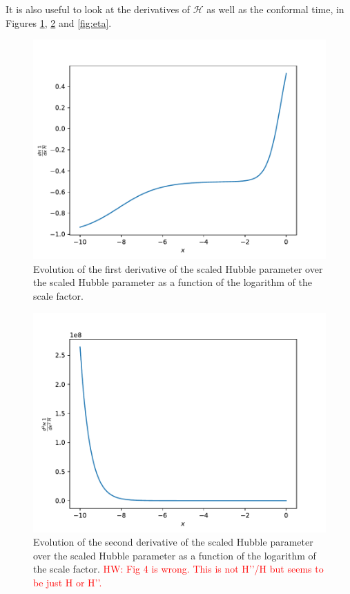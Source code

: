 \documentclass{aa}
\newcommand{\hw}[1]{\textcolor{red}{HW: #1}}
\begin{document}
It is also useful to look at the derivatives of $\mathcal H$ as well as the conformal time, in Figures \ref{fig:dhpdx}, \ref{fig:ddhpddx} and \ref{fig:eta}.
\begin{figure}[ht]
\centering
\includegraphics[width=\hsize]{figures/dHpdx_over_Hp.pdf}
  \caption{Evolution of the first derivative of the scaled Hubble parameter over the scaled Hubble parameter as a function of the logarithm of the scale factor.}
     \label{fig:dhpdx}
\end{figure}

\begin{figure}[ht]
\centering
\includegraphics[width=\hsize]{figures/ddHpddx_over_Hp.pdf}
  \caption{Evolution of the second derivative of the scaled Hubble parameter over the scaled Hubble parameter as a function of the logarithm of the scale factor. \hw{Fig 4 is wrong. This is not H’’/H but seems to be just H or H’’.}}
     \label{fig:ddhpddx}
\end{figure}
\end{document}
